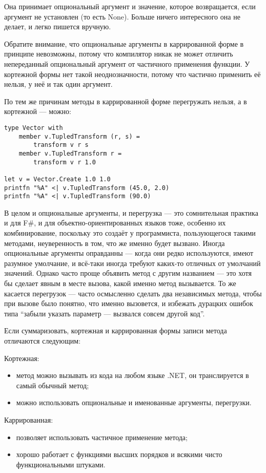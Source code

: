 \documentclass{../../text-style}
\begin{document}
Она принимает опциональный аргумент и значение, которое возвращается, если аргумент не установлен (то есть None).
Больше ничего интересного она не делает, и легко пишется вручную.

Обратите внимание, что опциональные аргументы в каррированной форме в принципе невозможны, потому что компилятор никак не может отличить непереданный опциональный аргумент от частичного применения функции.
У кортежной формы нет такой неоднозначности, потому что частично применить её нельзя, у неё и так один аргумент.

По тем же причинам методы в каррированной форме перегружать нельзя, а в кортежной --- можно:

\begin{verbatim}
type Vector with
    member v.TupledTransform (r, s) = 
        transform v r s
    member v.TupledTransform r = 
        transform v r 1.0

let v = Vector.Create 1.0 1.0
printfn "%A" <| v.TupledTransform (45.0, 2.0)
printfn "%A" <| v.TupledTransform (90.0)
\end{verbatim}

В целом и опциональные аргументы, и перегрузка --- это сомнительная практика и для F\#, и для объектно-ориентированных языков тоже, особенно их комбинирование, поскольку это создаёт у программиста, пользующегося такими методами, неуверенность в том, что же именно будет вызвано.
Иногда опциональные аргументы оправданны --- когда они редко используются, имеют разумное умолчание, и всё-таки иногда требуют каких-то отличных от умолчаний значений.
Однако часто проще объявить метод с другим названием --- это хотя бы сделает явным в месте вызова, какой именно метод вызывается.
То же касается перегрузок --- часто осмысленно сделать два независимых метода, чтобы при вызове было понятно, что именно вызовется, и избежать дурацких ошибок типа \enquote{забыли указать параметр --- вызвался совсем другой код}.

Если суммаризовать, кортежная и каррированная формы записи метода отличаются следующим:

Кортежная:
\begin{itemize}
    \item метод можно вызывать из кода на любом языке .NET, он транслируется в самый обычный метод;
    \item можно использовать опциональные и именованные аргументы, перегрузки.
\end{itemize}

Каррированная:
\begin{itemize}
    \item позволяет использовать частичное применение метода;
    \item хорошо работает с функциями высших порядков и всякими чисто функциональными штуками.
\end{itemize}
\end{document}
